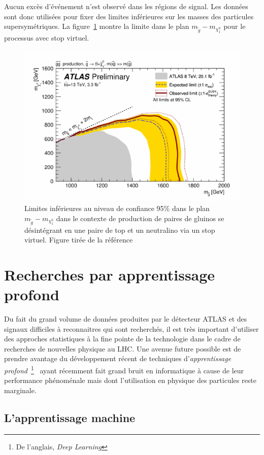 Aucun excès d'événement n'est observé dans les régions de signal.  Les
données sont donc utilisées pour fixer des limites inférieures sur les
masses des particules supersymétriques. La figure~\ref{fig:limit}
montre la limite dans le plan $m_{\tilde{g}}-m_{\chi_1^0}$ pour le
processus avec stop virtuel.

\begin{figure}[h!]
  \centering
  \includegraphics[width=.65\textwidth]{limit.pdf}
  \caption{Limites inférieures au niveau de confiance 95\% dans le
    plan $m_{\tilde{g}}-m_{\chi_1^0}$ dans le contexte de production
    de paires de gluinos se désintégrant en une paire de top et un
    neutralino via un stop virtuel.  Figure tirée de la
    référence~\cite{ATLAS-CONF-2015-067}}
  \label{fig:limit}
\end{figure}

\clearpage{}

\section{Recherches par apprentissage profond}
\label{sec:susy_atlas:dl}

Du fait du grand volume de données produites par le détecteur ATLAS et
des signaux difficiles à reconnaitres qui sont recherchés, il est très
important d'utiliser des approches statistiques à la fine pointe de la
technologie dans le cadre de recherches de nouvelles physique au
LHC. Une avenue future possible est de prendre avantage du
développement récent de techniques d'\emph{apprentissage
  profond}~\footnote{De l'anglais, \emph{Deep
    Learning}}~\cite{lecun_deep_2015, schmidhuber_deep_2015} ayant
récemment fait grand bruit en informatique à cause de leur performance
phénoménale mais dont l'utilisation en physique des particules reste
marginale.
 
\subsection{L'apprentissage machine}
\label{sec:susy_atlas:dl:ml}

